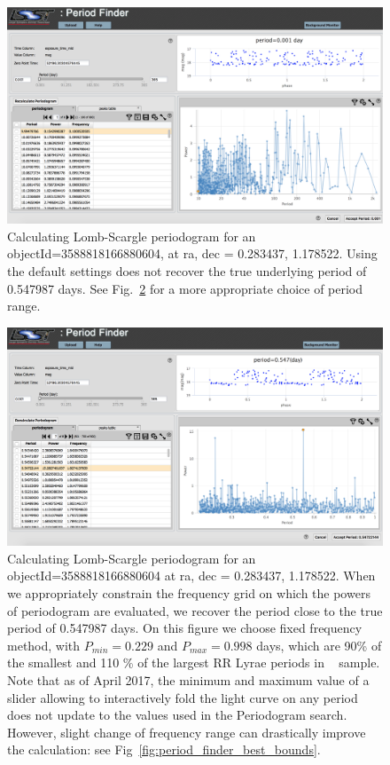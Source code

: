 \documentclass[DM,lsstdraft,toc]{lsstdoc}
\begin{document}
\begin{figure}
\includegraphics[width=\textwidth]{figs/Period_finder_defaults}
\caption{Calculating Lomb-Scargle periodogram for  an objectId=3588818166880604, at ra, dec = 0.283437\degree, 1.178522\degree. Using the default settings  does not recover the true underlying period of 0.547987 days. See Fig.~\ref{fig:period_finder_custom} for a more appropriate choice of period range.}
\label{fig:period_finder_default}
\end{figure}




\begin{figure}
\includegraphics[width=\textwidth]{figs/Period_finder_fix_freq_0229-0998}
\caption{Calculating Lomb-Scargle periodogram for an objectId=3588818166880604 at  ra, dec = 0.283437\degree, 1.178522\degree . When we appropriately constrain the frequency grid on which the powers of periodogram are evaluated, we recover the period close to the true period of  0.547987 days.  On this figure we choose fixed frequency method,  with $P_{min} =  0.229 $ and $P_{max} = 0.998$ days, which are 90\% of the smallest and 110 \% of the largest RR Lyrae periods in ~\citep{2010ApJ...708..717S} sample. Note that as of April 2017, the minimum and maximum value of a slider allowing to interactively fold the light curve on any period does not update to the values used in the Periodogram search. However, slight change of frequency range can drastically improve the calculation: see Fig~\ref{fig:period_finder_best_bounds}. }
\label{fig:period_finder_custom}
\end{figure}
\end{document}

